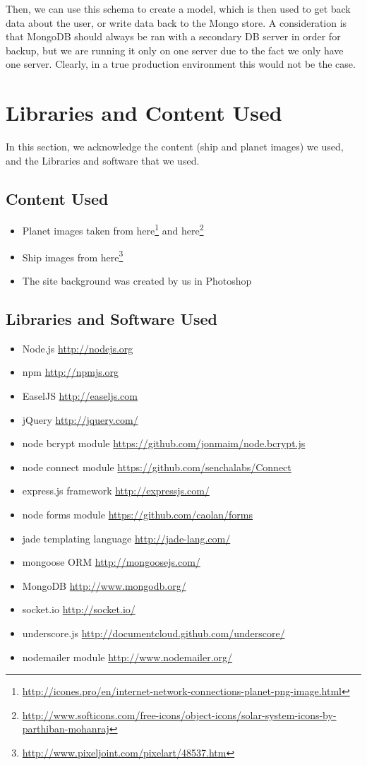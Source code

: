 \documentclass[a4paper,11pt]{article}
\begin{document}
			Then, we can use this schema to create a model, which is then used to get back data about the user, or write data back to the Mongo store. A consideration is that MongoDB should always be ran with a secondary DB server in order for backup, but we are running it only on one server due to the fact we only have one server. Clearly, in a true production environment this would not be the case.
			
	
	\section{Libraries and Content Used}
		In this section, we acknowledge the content (ship and planet images) we used, and the Libraries and software that we used.
		
		\subsection{Content Used}
			\begin{itemize}
				\item Planet images taken from here\footnote{\url{http://icones.pro/en/internet-network-connections-planet-png-image.html}} and here\footnote{\url{http://www.softicons.com/free-icons/object-icons/solar-system-icons-by-parthiban-mohanraj}}
				\item Ship images from here\footnote{\url{http://www.pixeljoint.com/pixelart/48537.htm}}
				\item The site background was created by us in Photoshop
			\end{itemize}
			
		\subsection{Libraries and Software Used}
			\begin{itemize}
				\item Node.js \url{http://nodejs.org}
				\item npm \url{http://npmjs.org}
				\item EaselJS \url{http://easeljs.com}
				\item jQuery \url{http://jquery.com/}
				\item node bcrypt module \url{https://github.com/jonmaim/node.bcrypt.js}
				\item node connect module \url{https://github.com/senchalabs/Connect}
				\item express.js framework \url{http://expressjs.com/}
				\item node forms module \url{https://github.com/caolan/forms}
				\item jade templating language \url{http://jade-lang.com/}
				\item mongoose ORM \url{http://mongoosejs.com/}
				\item MongoDB \url{http://www.mongodb.org/}
				\item socket.io \url{http://socket.io/}
				\item underscore.js \url{http://documentcloud.github.com/underscore/}
				\item nodemailer module \url{http://www.nodemailer.org/}
			\end{itemize}
	
\end{document}
